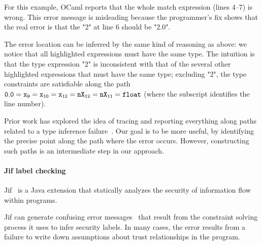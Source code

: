 For this example, OCaml reports that the whole match expression (lines
4--7) is wrong. This error message is misleading because the programmer's
fix shows that the real error is that the "2" at line 6 should be "2.0".

The error location can be inferred by the same kind of reasoning as
above: we notice that all highlighted
expressions must have the same type. The intuition is that
the type expression "2" is inconsistent with that of the several
other highlighted expressions that must have the same type;
excluding "2", the type constraints are satisfiable along the path
$\mathtt{0.0=x_{9}=x_{10}=x_{12}=nX_{12}=nX_{11}=float}$ (where the
subscript identifies the line number).

Prior work has explored the idea of tracing and reporting everything
along paths related to a type inference
failure~\cite{wand-errorfinding,choppella95, haack:slicing,
tip:slicing}. Our goal is to be more useful, by identifying the
precise point along the path where the error occurs. However,
constructing such paths is an intermediate step in our approach.

% 
% 
% 
%

\paragraph{Jif label checking}

Jif~\cite{jif} is a Java extension that statically analyzes the
security of information flow within programs. 

Jif can generate confusing error messages~\cite{king:fse} that result
from the constraint solving process it uses to infer security labels.
In many cases, the error results from a failure to write down
assumptions about trust relationships in the program.

